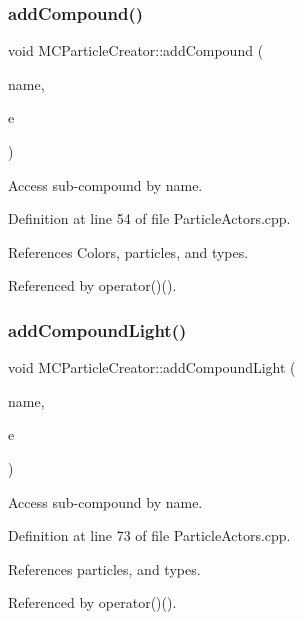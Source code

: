 \subsubsection{\texorpdfstring{add\+Compound()}{addCompound()}}
{\footnotesize\ttfamily void M\+C\+Particle\+Creator\+::add\+Compound (\begin{DoxyParamCaption}\item[{const std\+::string \&}]{name,  }\item[{T\+Eve\+Line $\ast$}]{e }\end{DoxyParamCaption})}



Access sub-\/compound by name. 



Definition at line 54 of file Particle\+Actors.\+cpp.



References Colors, particles, and types.



Referenced by operator()().

\hypertarget{struct_d_d4hep_1_1_m_c_particle_creator_a7b64ce56bb99131d20afbccf27760828}{}\label{struct_d_d4hep_1_1_m_c_particle_creator_a7b64ce56bb99131d20afbccf27760828} 
\subsubsection{\texorpdfstring{add\+Compound\+Light()}{addCompoundLight()}}
{\footnotesize\ttfamily void M\+C\+Particle\+Creator\+::add\+Compound\+Light (\begin{DoxyParamCaption}\item[{const std\+::string \&}]{name,  }\item[{T\+Eve\+Line $\ast$}]{e }\end{DoxyParamCaption})}



Access sub-\/compound by name. 



Definition at line 73 of file Particle\+Actors.\+cpp.



References particles, and types.



Referenced by operator()().

